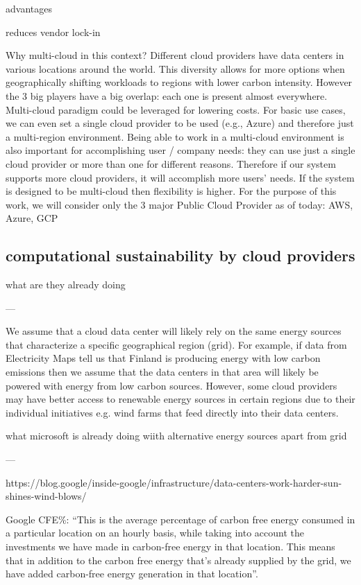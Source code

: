 advantages

reduces vendor lock-in


Why multi-cloud in this context?
Different cloud providers have data centers in various locations around the world. This diversity allows for more options when geographically shifting workloads to regions with lower carbon intensity.
However the 3 big players have a big overlap: each one is present almost everywhere.
Multi-cloud paradigm could be leveraged for lowering costs.
For basic use cases, we can even set a single cloud provider to be used (e.g., Azure) and therefore just a multi-region environment.
Being able to work in a multi-cloud environment is also important for accomplishing user / company needs: they can use just a single cloud provider or more than one for different reasons. Therefore if our system supports more cloud providers, it will accomplish more users' needs.
If the system is designed to be multi-cloud then flexibility is higher.
For the purpose of this work, we will consider only the 3 major Public Cloud Provider as of today: AWS, Azure, GCP





\subsection{computational sustainability by cloud providers}

what are they already doing

---

We assume that a cloud data center will likely rely on the same energy sources that characterize a specific geographical region (grid).
For example, if data from Electricity Maps tell us that Finland is producing energy with low carbon emissions then we assume that the data centers in that area will likely be powered with energy from low carbon sources.
However, some cloud providers may have better access to renewable energy sources in certain regions due to their individual initiatives e.g. wind farms that feed directly into their data centers.

what microsoft is already doing wiith alternative energy sources apart from grid


---

https://blog.google/inside-google/infrastructure/data-centers-work-harder-sun-shines-wind-blows/

Google CFE\%: “This is the average percentage of carbon free energy consumed in a particular location on an hourly basis, while taking into account the investments we have made in carbon-free energy in that location. This means that in addition to the carbon free energy that's already supplied by the grid, we have added carbon-free energy generation in that location”.


